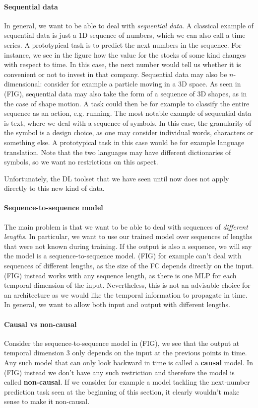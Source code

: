 \paragraph{Sequential data}

In general, we want to be able to deal with \emph{sequential data}.
A classical example of sequential data is just a 1D sequence of numbers, which we can also call a time series.
A prototypical task is to predict the next numbers in the sequence.
For instance, we see in the figure how the value for the stocks of some kind changes with respect to time. In this case, the next number would tell us whether it is convenient or not to invest in that company. 
Sequential data may also be $n$-dimensional: consider for example a particle moving in a 3D space.
As seen in (FIG), sequential data may also take the form of a sequence of 3D shapes, as in the case of shape motion. A task could then be for example to classify the entire sequence as an action, e.g. running.
The most notable example of sequential data is text, where we deal with a sequence of symbols. In this case, the granularity of the symbol is a design choice, as one may consider individual words, characters or something else. A prototypical task in this case would be for example language translation. Note that the two languages may have different dictionaries of symbols, so we want no restrictions on this aspect.

Unfortunately, the DL toolset that we have seen until now does not apply directly to this new kind of data.

\paragraph{Sequence-to-sequence model}
The main problem is that we want to be able to deal with sequences of \emph{different lengths}. In particular, we want to use our trained model over sequences of lengths that were not known during training.
If the output is also a sequence, we will say the model is a sequence-to-sequence model.
(FIG) for example can't deal with sequences of different lengths, as the size of the FC depends directly on the input. 
(FIG) instead works with any sequence length, as there is one MLP for each temporal dimension of the input. Nevertheless, this is not an advisable choice for an architecture as we would like the temporal information to propagate in time.
In general, we want to allow both input and output with different lengths.

\paragraph{Causal vs non-causal}
Consider the sequence-to-sequence model in (FIG), we see that the output at temporal dimension $3$ only depends on the input at the previous points in time. Any such model that can only look backward in time is called a \textbf{causal} model. In (FIG) instead we don't have any such restriction and therefore the model is called \textbf{non-causal}.
If we consider for example a model tackling the next-number prediction task seen at the beginning of this section, it clearly wouldn't make sense to make it non-causal. 

